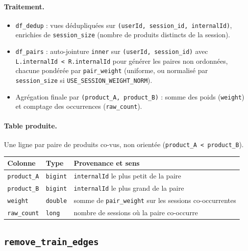 \documentclass[11pt,a4paper]{article}
\newcommand{\code}[1]{\texttt{\small #1}}
\begin{document}
\paragraph{Traitement.}
\begin{itemize}[nosep,leftmargin=*]
  \item \code{df\_dedup} : vues dédupliquées sur \code{(userId, session\_id,
        internalId)}, enrichies de \code{session\_size} (nombre de produits
        distincts de la session).
  \item \code{df\_pairs} : auto-jointure \code{inner} sur \code{(userId,
        session\_id)} avec \code{L.internalId < R.internalId} pour générer les
        paires non ordonnées, chacune pondérée par \code{pair\_weight}
        (uniforme, ou normalisé par \code{session\_size} si
        \code{USE\_SESSION\_WEIGHT\_NORM}).
  \item Agrégation finale par \code{(product\_A, product\_B)} : somme des
        poids (\code{weight}) et comptage des occurrences (\code{raw\_count}).
\end{itemize}

\paragraph{Table produite.}
Une ligne par paire de produits co-vus, non orientée (\code{product\_A < product\_B}).
\begin{center}
\small
\begin{tabular}{@{}llp{6.8cm}@{}}
\toprule
\textbf{Colonne} & \textbf{Type} & \textbf{Provenance et sens} \\
\midrule
\code{product\_A} & \code{bigint} & \code{internalId} le plus petit de la paire \\
\code{product\_B} & \code{bigint} & \code{internalId} le plus grand de la paire \\
\code{weight} & \code{double} & somme de \code{pair\_weight} sur les sessions co-occurrentes \\
\code{raw\_count} & \code{long} & nombre de sessions où la paire co-occurre \\
\bottomrule
\end{tabular}
\end{center}

\subsection{\texttt{remove\_train\_edges}}
\label{subsec:fn-remove-train-edges}
\end{document}
